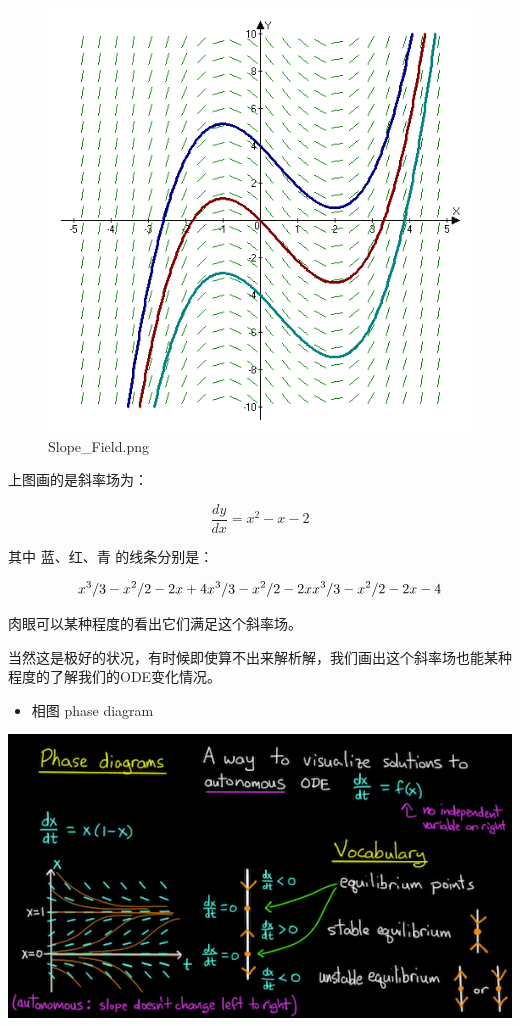 \documentclass[
]{book}
\providecommand{\tightlist}{%
  \setlength{\itemsep}{0pt}\setlength{\parskip}{0pt}}
\begin{document}
\begin{figure}
\centering
\includegraphics{images/Slope_Field.png}
\caption{Slope\_Field.png}
\end{figure}

上图画的是斜率场为：

\[
\frac{dy}{dx} = x^2 - x - 2
\]

其中 蓝、红、青 的线条分别是：

\[
x^3/3 - x^2/2 -2x+4 \\
x^3/3 - x^2/2 -2x \\
x^3/3 - x^2/2 -2x-4
\]

肉眼可以某种程度的看出它们满足这个斜率场。

当然这是极好的状况，有时候即使算不出来解析解，我们画出这个斜率场也能某种程度的了解我们的ODE变化情况。

\begin{itemize}
\tightlist
\item
  相图 phase diagram
\end{itemize}

\includegraphics{images/phase_diagram_2.png}
\end{document}
